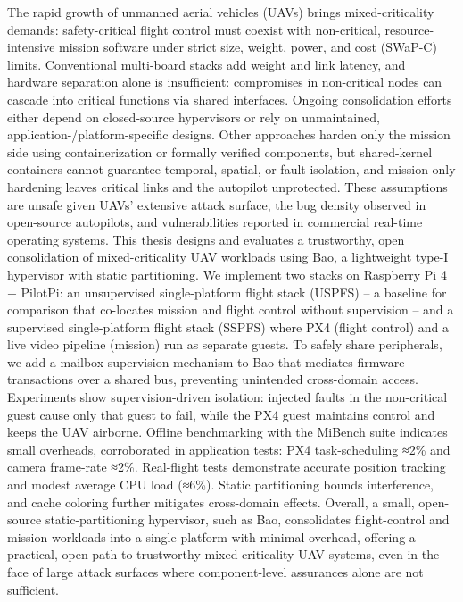 
%
The rapid growth of unmanned aerial vehicles (UAVs) brings mixed-criticality
demands: safety-critical flight control must coexist with non-critical,
resource-intensive mission software under strict size, weight, power, and cost
(SWaP-C) limits. Conventional multi-board stacks add weight and link latency, and
hardware separation alone is insufficient: compromises in non-critical nodes can
cascade into critical functions via shared interfaces. Ongoing consolidation
efforts either depend on closed-source hypervisors
or rely on unmaintained, application-/platform-specific designs.
Other
approaches harden only the mission side using containerization
or formally verified components,
but shared-kernel containers
cannot guarantee temporal, spatial, or fault isolation, and mission-only
hardening leaves critical links and the autopilot unprotected. These assumptions
are unsafe given UAVs' extensive attack surface, the bug density observed in
open-source autopilots, and vulnerabilities reported in commercial real-time
operating systems.
%
This thesis designs and evaluates a trustworthy, open consolidation of
mixed-criticality UAV workloads using Bao, a lightweight type-I hypervisor with
static partitioning. We implement two stacks on Raspberry Pi 4 + PilotPi: an
unsupervised single-platform flight stack (USPFS) -- a baseline for comparison
that co-locates mission and flight control without supervision -- and a
supervised single-platform flight stack (SSPFS) where PX4 (flight control) and a
live video pipeline (mission) run as separate guests. To safely share peripherals, we add a
mailbox-supervision mechanism to Bao that mediates firmware transactions over a
shared bus, preventing unintended cross-domain access.
%
Experiments show supervision-driven isolation: injected faults in the
non-critical guest cause only that guest to fail, while the PX4 guest maintains
control and keeps the UAV airborne. Offline benchmarking with the MiBench suite
indicates small overheads, corroborated in application tests: PX4
task-scheduling ≈2\% and camera frame-rate ≈2\%. Real-flight tests demonstrate accurate position tracking and modest average CPU load (≈6\%). Static partitioning bounds interference, and cache
coloring further mitigates cross-domain effects.
%
Overall, a small, open-source static-partitioning hypervisor, such as Bao,
consolidates flight-control and mission workloads into a single platform with
minimal overhead, offering a practical, open path to trustworthy
mixed-criticality UAV systems, even in the face of large attack surfaces where
component-level assurances alone are not sufficient.

